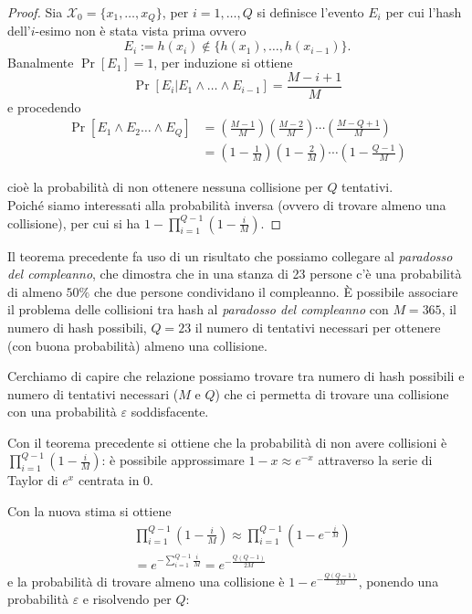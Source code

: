 \begin{proof}
    Sia $\mathcal{X}_0 = \{x_1,\dots,x_Q\}$, per $i = 1,\dots,Q$ si definisce l'evento $E_i$ per cui l'hash dell'$i$-esimo non è stata vista prima ovvero
    \[
        E_i := h(x_i) \notin \{h(x_1),\dots,h(x_{i-1})\}.
    \]
    Banalmente $\Pr[E_1] = 1$, per induzione si ottiene
    \[
        \Pr[E_i | E_1 \land \dots \land E_{i-1}] = \frac{M - i + 1}{M}
    \] e procedendo
    \begin{align*}    
        \Pr[E_1 \land E_2 \dots \land E_Q] &= \left( \frac{M-1}{M} \right)\left( \frac{M-2}{M} \right) \cdots \left( \frac{M-Q+1}{M} \right)\\
        &= \left(1-\frac{1}{M}\right)\left(1-\frac{2}{M}\right) \cdots \left(1 - \frac{Q-1}{M}\right)
    \end{align*}
    
    \noindent cioè la probabilità di non ottenere nessuna collisione per $Q$ tentativi. \\Poiché siamo interessati alla probabilità inversa (ovvero di trovare almeno una collisione), per cui si ha $1 - \prod_{i=1}^{Q-1}\left(1-\frac{i}{M}\right)$.

\end{proof}

Il teorema precedente fa uso di un risultato che possiamo collegare al \textit{paradosso del compleanno}, che dimostra che in una stanza di 23 persone c'è una probabilità di almeno $50\%$ che due persone condividano il compleanno. È possibile associare il problema delle collisioni tra hash al \textit{paradosso del compleanno} con $M = 365$, il numero di hash possibili, $Q = 23$ il numero di tentativi necessari per ottenere (con buona probabilità) almeno una collisione.

Cerchiamo di capire che relazione possiamo trovare tra numero di hash possibili e numero di tentativi necessari ($M$ e $Q$) che ci permetta di trovare una collisione con una probabilità $\varepsilon$ soddisfacente.

Con il teorema precedente si ottiene che la probabilità di non avere collisioni è $\prod_{i=1}^{Q-1}\left(1-\frac{i}{M}\right)$: è possibile approssimare $1- x \approx e^{-x}$ attraverso la serie di Taylor di $e^{x}$ centrata in 0.

Con la nuova stima si ottiene 
\begin{align*}
    &\prod_{i=1}^{Q-1}\left(1-\frac{i}{M}\right) \approx \prod_{i=1}^{Q-1}\left(1- e^{-\frac{i}{M}}\right)\\
    &= e^{-\sum_{i=1}^{Q-1}\frac{i}{M}} = e^{-\frac{Q(Q-1)}{2M}}
\end{align*}
e la probabilità di trovare almeno una collisione è $1 - e^{-\frac{Q(Q-1)}{2M}}$, ponendo una probabilità $\varepsilon$ e risolvendo per $Q$:

